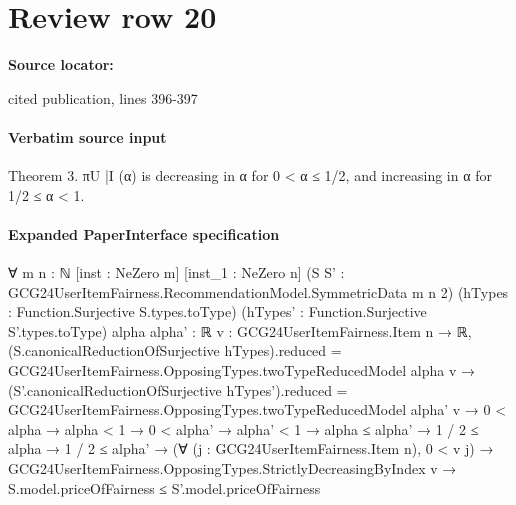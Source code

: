 \documentclass[10pt]{article}
\begin{document}
\section*{Review row 20}
\textbf{Source locator:} {\footnotesize\raggedright cited publication, lines 396-\allowbreak{}397\par}
\paragraph{Verbatim source input}
\begin{ReviewVerbatim}
Theorem 3. πU
|I (α) is decreasing in α for 0 < α ≤ 1/2, and increasing in α for 1/2 ≤ α < 1.
\end{ReviewVerbatim}



\paragraph{Expanded PaperInterface specification}
\begin{ReviewVerbatim}
∀ {m n : ℕ} [inst : NeZero m] [inst_1 : NeZero n] (S S' : GCG24UserItemFairness.RecommendationModel.SymmetricData m n 2)
  (hTypes : Function.Surjective S.types.toType) (hTypes' : Function.Surjective S'.types.toType) {alpha alpha' : ℝ}
  {v : GCG24UserItemFairness.Item n → ℝ},
  (S.canonicalReductionOfSurjective hTypes).reduced = GCG24UserItemFairness.OpposingTypes.twoTypeReducedModel alpha v →
    (S'.canonicalReductionOfSurjective hTypes').reduced =
        GCG24UserItemFairness.OpposingTypes.twoTypeReducedModel alpha' v →
      0 < alpha →
        alpha < 1 →
          0 < alpha' →
            alpha' < 1 →
              alpha ≤ alpha' →
                1 / 2 ≤ alpha →
                  1 / 2 ≤ alpha' →
                    (∀ (j : GCG24UserItemFairness.Item n), 0 < v j) →
                      GCG24UserItemFairness.OpposingTypes.StrictlyDecreasingByIndex v →
                        S.model.priceOfFairness ≤ S'.model.priceOfFairness
\end{ReviewVerbatim}
\end{document}
